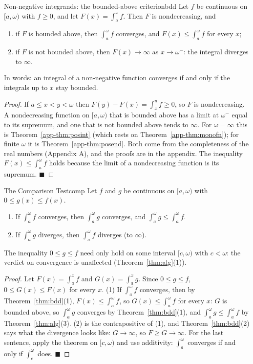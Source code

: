 \documentclass[11pt]{article}
\begin{document}
\begin{thm}{Non-negative integrands: the bounded-above criterion}{bdd}
Let $f$ be continuous on $[a,\omega)$ with $f\ge0$, and let $F(x)=\int_a^xf$. Then $F$ is nondecreasing, and
\begin{enumerate}[label=(\arabic*),leftmargin=*]
  \item if $F$ is bounded above, then $\int_a^\omega f$ converges, and $F(x)\le\int_a^\omega f$ for every $x$;
  \item if $F$ is not bounded above, then $F(x)\to\infty$ as $x\to\omega^-$: the integral diverges to $\infty$.
\end{enumerate}
In words: an integral of a non-negative function converges if and only if the integrals up to $x$ stay bounded.
\end{thm}
\begin{proof}
If $a\le x<y<\omega$ then $F(y)-F(x)=\int_x^yf\ge0$, so $F$ is nondecreasing. A nondecreasing function on $[a,\omega)$ that is bounded above has a limit at $\omega^-$ equal to its supremum, and one that is not bounded above tends to $\infty$. For $\omega=\infty$ this is Theorem~\ref{app-thm:posint} (which rests on Theorem~\ref{app-thm:monofn}); for finite $\omega$ it is Theorem~\ref{app-thm:posend}. Both come from the completeness of the real numbers (Appendix A), and the proofs are in the appendix. The inequality $F(x)\le\int_a^\omega f$ holds because the limit of a nondecreasing function is its supremum. $\blacksquare$
\end{proof}

\begin{thm}{The Comparison Test}{comp}
Let $f$ and $g$ be continuous on $[a,\omega)$ with $0\le g(x)\le f(x)$.
\begin{enumerate}[label=(\arabic*),leftmargin=*]
  \item If $\int_a^\omega f$ converges, then $\int_a^\omega g$ converges, and $\int_a^\omega g\le\int_a^\omega f$.
  \item If $\int_a^\omega g$ diverges, then $\int_a^\omega f$ diverges (to $\infty$).
\end{enumerate}
The inequality $0\le g\le f$ need only hold on some interval $[c,\omega)$ with $c<\omega$: the verdict on convergence is unaffected (Theorem~\ref{thm:alg}(1)).
\end{thm}
\begin{proof}
Let $F(x)=\int_a^xf$ and $G(x)=\int_a^xg$. Since $0\le g\le f$, $0\le G(x)\le F(x)$ for every $x$. (1) If $\int_a^\omega f$ converges, then by Theorem~\ref{thm:bdd}(1), $F(x)\le\int_a^\omega f$, so $G(x)\le\int_a^\omega f$ for every $x$: $G$ is bounded above, so $\int_a^\omega g$ converges by Theorem~\ref{thm:bdd}(1), and $\int_a^\omega g\le\int_a^\omega f$ by Theorem~\ref{thm:alg}(3). (2) is the contrapositive of (1), and Theorem~\ref{thm:bdd}(2) says what the divergence looks like: $G\to\infty$, so $F\ge G\to\infty$. For the last sentence, apply the theorem on $[c,\omega)$ and use additivity: $\int_a^\omega$ converges if and only if $\int_c^\omega$ does. $\blacksquare$
\end{proof}
\end{document}
